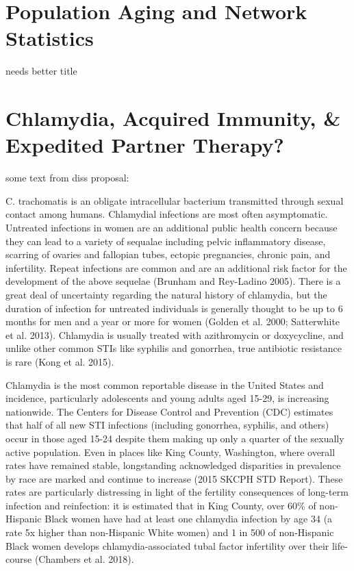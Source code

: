 \documentclass [11pt, proquest] {uwthesis}[2015/03/03]
\begin{document}
\chapter{Population Aging and Network Statistics}\label{nets}

needs better title

\chapter{Chlamydia, Acquired Immunity, \& Expedited Partner
Therapy?}\label{ept}

some text from diss proposal:

C. trachomatis is an obligate intracellular bacterium transmitted
through sexual contact among humans. Chlamydial infections are most
often asymptomatic. Untreated infections in women are an additional
public health concern because they can lead to a variety of sequalae
including pelvic inflammatory disease, scarring of ovaries and fallopian
tubes, ectopic pregnancies, chronic pain, and infertility. Repeat
infections are common and are an additional risk factor for the
development of the above sequelae (Brunham and Rey-Ladino 2005). There
is a great deal of uncertainty regarding the natural history of
chlamydia, but the duration of infection for untreated individuals is
generally thought to be up to 6 months for men and a year or more for
women (Golden et al. 2000; Satterwhite et al. 2013). Chlamydia is
usually treated with azithromycin or doxycycline, and unlike other
common STIs like syphilis and gonorrhea, true antibiotic resistance is
rare (Kong et al. 2015).

Chlamydia is the most common reportable disease in the United States and
incidence, particularly adolescents and young adults aged 15-29, is
increasing nationwide. The Centers for Disease Control and Prevention
(CDC) estimates that half of all new STI infections (including
gonorrhea, syphilis, and others) occur in those aged 15-24 despite them
making up only a quarter of the sexually active population. Even in
places like King County, Washington, where overall rates have remained
stable, longstanding acknowledged disparities in prevalence by race are
marked and continue to increase (2015 SKCPH STD Report). These rates are
particularly distressing in light of the fertility consequences of
long-term infection and reinfection: it is estimated that in King
County, over 60\% of non-Hispanic Black women have had at least one
chlamydia infection by age 34 (a rate 5x higher than non-Hispanic White
women) and 1 in 500 of non-Hispanic Black women develops
chlamydia-associated tubal factor infertility over their life-course
(Chambers et al. 2018).
\end{document}
